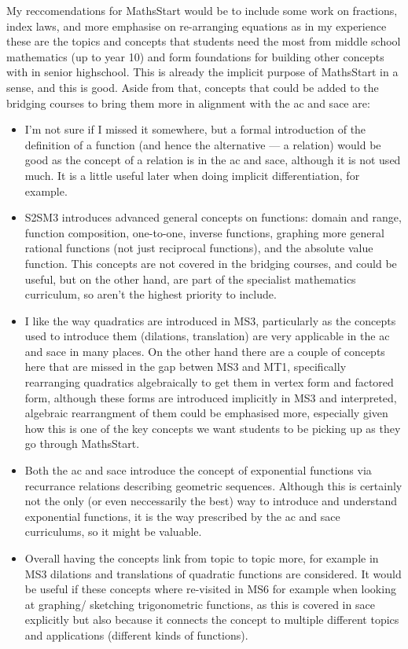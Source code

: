 \documentclass[twoside,12pt,a4paper]{report}
\begin{document}
My reccomendations for MathsStart would be to include some work on fractions, index laws, and more emphasise on re-arranging equations  as in my experience these are the topics and concepts that students need the most from middle school mathematics (up to year 10) and form foundations for building other concepts with in senior highschool. This is already the implicit purpose of MathsStart in a sense, and this is good. Aside from that, concepts that could be added to the bridging courses to bring them more in alignment with the \gls{ac} and \gls{sace} are:
\begin{itemize}
	\item I'm not sure if I missed it somewhere, but a formal introduction of the definition of a function (and hence the alternative --- a relation) would be good as the concept of a relation is in the \gls{ac} and \gls{sace}, although it is not used much. It is a little useful later when doing implicit differentiation, for example.
	\item S2SM3 introduces advanced general concepts on functions: domain and range, function composition, one-to-one, inverse functions, graphing more general rational functions (not just reciprocal functions), and the absolute value function. This concepts are not covered in the bridging courses, and could be useful, but on the other hand, are part of the specialist mathematics curriculum, so aren't the highest priority to include.
	\item I like the way quadratics are introduced in MS3, particularly as the concepts used to introduce them (dilations, translation) are very applicable in the \gls{ac} and \gls{sace} in many places. On the other hand there are a couple of concepts here that are missed in the gap betwen MS3 and MT1, specifically rearranging quadratics algebraically to get them in vertex form and factored form, although these forms are introduced implicitly in MS3 and interpreted, algebraic rearrangment of them could be emphasised more, especially given how this is one of the key concepts we want students to be picking up as they go through MathsStart. 
	\item Both the \gls{ac} and \gls{sace} introduce the concept of exponential functions via recurrance relations describing geometric sequences. Although this is certainly not the only (or even neccessarily the best) way to introduce and understand exponential functions, it is the way prescribed by the \gls{ac} and \gls{sace} curriculums, so it might be valuable. 
	\item Overall having the concepts link from topic to topic more, for example in MS3 dilations and translations of quadratic functions are considered. It would be useful if these concepts where re-visited in MS6 for example when looking at graphing/ sketching trigonometric functions, as this is covered in \gls{sace} explicitly but also because it connects the concept to multiple different topics and applications (different kinds of functions).

\end{itemize}
\end{document}
